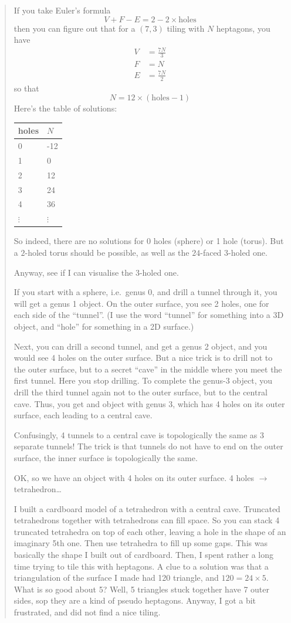 \documentclass{article}
\begin{document}
\begin{quote}
If you take Euler's formula \[V+F-E = 2-2\times\text{holes}\] then you
can figure out that for a \((7,3)\) tiling with \(N\) heptagons, you
have \[
  \begin{aligned}
    V &= \frac{7N}{3}
  \\F &= N
  \\E &= \frac{7N}{2}    
  \end{aligned}
\] so that \[N = 12\times(\text{holes}-1)\] Here's the table of
solutions:

\begin{longtable}[]{@{}ll@{}}
\toprule
holes & \(N\)\tabularnewline
\midrule
\endhead
0 & -12\tabularnewline
1 & 0\tabularnewline
2 & 12\tabularnewline
3 & 24\tabularnewline
4 & 36\tabularnewline
\(\vdots\) & \(\vdots\)\tabularnewline
\bottomrule
\end{longtable}

So indeed, there are no solutions for 0 holes (sphere) or 1 hole
(torus). But a \(2\)-holed torus should be possible, as well as the
\(24\)-faced \(3\)-holed one.

Anyway, see if I can visualise the \(3\)-holed one.

If you start with a sphere, i.e.~genus 0, and drill a tunnel through it,
you will get a genus 1 object. On the outer surface, you see 2 holes,
one for each side of the ``tunnel''. (I use the word ``tunnel'' for
something into a 3D object, and ``hole'' for something in a 2D surface.)

Next, you can drill a second tunnel, and get a genus 2 object, and you
would see 4 holes on the outer surface. But a nice trick is to drill not
to the outer surface, but to a secret ``cave'' in the middle where you
meet the first tunnel. Here you stop drilling. To complete the genus-3
object, you drill the third tunnel again not to the outer surface, but
to the central cave. Thus, you get and object with genus 3, which has 4
holes on its outer surface, each leading to a central cave.

Confusingly, 4 tunnels to a central cave is topologically the same as 3
separate tunnels! The trick is that tunnels do not have to end on the
outer surface, the inner surface is topologically the same.

OK, so we have an object with 4 holes on its outer surface. 4 holes $\to$
tetrahedron\ldots{}

I built a cardboard model of a tetrahedron with a central cave.
Truncated tetrahedrons together with tetrahedrons can fill space. So you
can stack 4 truncated tetrahedra on top of each other, leaving a hole in
the shape of an imaginary 5th one. Then use tetrahedra to fill up some
gaps. This was basically the shape I built out of cardboard. Then, I
spent rather a long time trying to tile this with heptagons. A clue to a
solution was that a triangulation of the surface I made had 120
triangle, and \(120 = 24\times5\). What is so good about 5? Well, 5
triangles stuck together have 7 outer sides, sop they are a kind of
pseudo heptagons. Anyway, I got a bit frustrated, and did not find a
nice tiling.


\end{quote}
\end{document}
